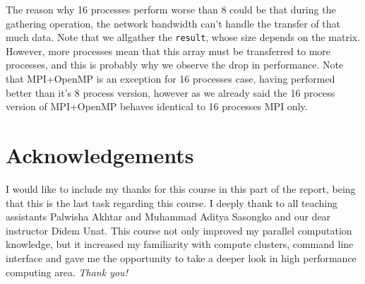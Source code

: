 \documentclass[12pt,reqno]{amsart}
\newcommand{\code}[1]{\texttt{#1}}
\begin{document}
The reason why 16 processes perform worse than 8 could be that during the gathering operation, the network bandwidth can't handle the transfer of that much data. Note that we allgather the \code{result}, whose size depends on the matrix. However, more processes mean that this array must be transferred to more processes, and this is probably why we observe the drop in performance. Note that MPI+OpenMP is an exception for 16 processes case, having performed better than it's 8 process version, however as we already said the 16 process version of MPI+OpenMP behaves identical to 16 processes MPI only.

\section{Acknowledgements}
I would like to include my thanks for this course in this part of the report, being that this is the last task regarding this course. I deeply thank to all teaching assistants Palwisha Akhtar and Muhammad Aditya Sasongko and our dear instructor Didem Unat. This course not only improved my parallel computation knowledge, but it increased my familiarity with compute clusters, command line interface and gave me the opportunity to take a deeper look in high performance computing area. \textit{Thank you!}
\end{document}
